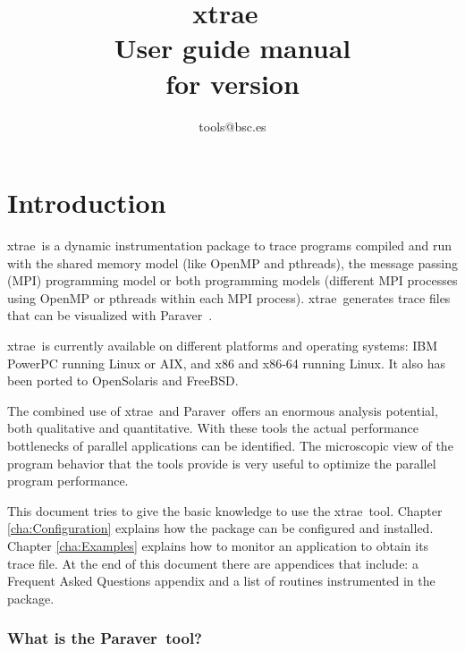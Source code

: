 \documentclass[twoside,a4,english,11pt]{book}
\newcommand{\TRACE}{{\sf {E}xtrae}\ }
\newcommand{\PARAVER}{{\sf Paraver}\ }
\begin{document}


\title{\TRACE \\
       User guide manual\\
       for version \TRACEVERSION}
\author{
tools@bsc.es
}

\maketitle
\tableofcontents
\listoffigures
\listoftables





\chapter{Introduction}\label{cha:Introduction}


\TRACE is a dynamic instrumentation package to trace programs compiled and run with the shared memory model (like OpenMP and pthreads), the message passing (MPI) programming model or both programming models (different MPI processes using OpenMP or pthreads within each MPI process). \TRACE generates trace files that can be visualized with \PARAVER.

\TRACE is currently available on different platforms and operating systems: IBM PowerPC running Linux or AIX, and x86 and x86-64 running Linux. It also has been ported to OpenSolaris and FreeBSD.

The combined use of \TRACE and \PARAVER offers an enormous analysis potential, both qualitative and quantitative. With these tools the actual performance bottlenecks of parallel applications can be identified. The microscopic view of the program behavior that the tools provide is very useful to optimize the parallel program performance.

This document tries to give the basic knowledge to use the \TRACE tool. Chapter \ref{cha:Configuration} explains how the package can be configured and installed. Chapter \ref{cha:Examples} explains how to monitor an application to obtain its trace file. At the end of this document there are appendices that include: a Frequent Asked Questions appendix and a list of routines instrumented in the package.

\subsection*{What is the \PARAVER tool?}
\end{document}
